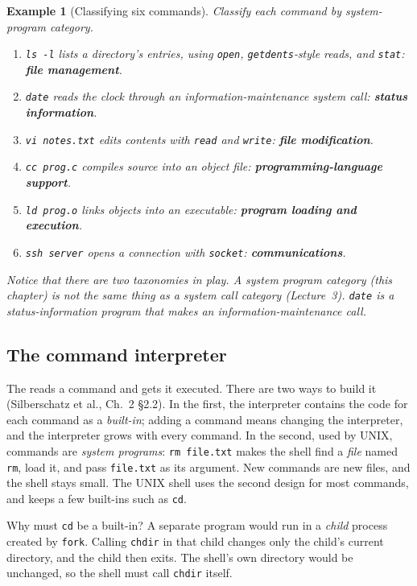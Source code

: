 \documentclass[11pt]{article}
\newtheorem{example}{Example}
\begin{document}
\begin{example}[Classifying six commands]
Classify each command by system-program category.
\begin{enumerate}
  \item \texttt{ls -l} lists a directory's entries, using \texttt{open},
        \texttt{getdents}-style reads, and \texttt{stat}: \textbf{file
        management}.
  \item \texttt{date} reads the clock through an information-maintenance
        system call: \textbf{status information}.
  \item \texttt{vi notes.txt} edits contents with \texttt{read} and
        \texttt{write}: \textbf{file modification}.
  \item \texttt{cc prog.c} compiles source into an object file:
        \textbf{programming-language support}.
  \item \texttt{ld prog.o} links objects into an executable: \textbf{program
        loading and execution}.
  \item \texttt{ssh server} opens a connection with \texttt{socket}:
        \textbf{communications}.
\end{enumerate}
Notice that there are two taxonomies in play. A system \emph{program}
category (this chapter) is not the same thing as a system \emph{call} category
(Lecture~3). \texttt{date} is a status-information \emph{program} that makes an
information-maintenance \emph{call}.
\end{example}

\subsection{The command interpreter}

The  reads a command and gets it executed. There are two ways to
build it (Silberschatz et al., Ch.~2 \S2.2). In the first, the interpreter
contains the code for each command as a \emph{built-in}; adding a command means
changing the interpreter, and the interpreter grows with every command. In the
second, used by UNIX, commands are \emph{system programs}: \texttt{rm file.txt}
makes the shell find a \emph{file} named \texttt{rm}, load it, and pass
\texttt{file.txt} as its argument. New commands are new files, and the shell
stays small. The UNIX shell uses the second design for most commands, and keeps
a few built-ins such as \texttt{cd}.

Why must \texttt{cd} be a built-in? A separate program would run in a
\emph{child} process created by \texttt{fork}. Calling \texttt{chdir} in that
child changes only the child's current directory, and the child then exits.
The shell's own directory would be unchanged, so the shell must call
\texttt{chdir} itself.
\end{document}
